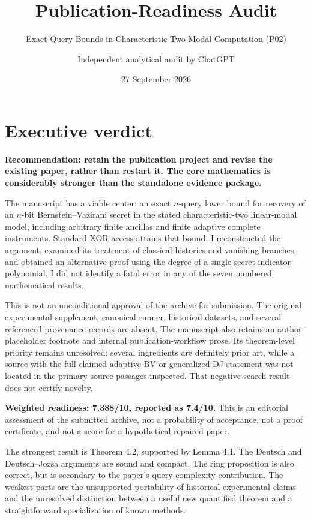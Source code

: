 \documentclass[
  11pt,
]{article}
\title{Publication-Readiness Audit}
\subtitle{Exact Query Bounds in Characteristic-Two Modal Computation
(P02)}
\author{Independent analytical audit by ChatGPT}
\date{27 September 2026}
\begin{document}
\maketitle

\section{Executive verdict}\label{executive-verdict}

\textbf{Recommendation: retain the publication project and revise the
existing paper, rather than restart it. The core mathematics is
considerably stronger than the standalone evidence package.}

The manuscript has a viable center: an exact \(n\)-query lower bound for
recovery of an \(n\)-bit Bernstein--Vazirani secret in the stated
characteristic-two linear-modal model, including arbitrary finite
ancillas and finite adaptive complete instruments. Standard XOR access
attains that bound. I reconstructed the argument, examined its treatment
of classical histories and vanishing branches, and obtained an
alternative proof using the degree of a single secret-indicator
polynomial. I did not identify a fatal error in any of the seven
numbered mathematical results.

This is not an unconditional approval of the archive for submission. The
original experimental supplement, canonical runner, historical datasets,
and several referenced provenance records are absent. The manuscript
also retains an author-placeholder footnote and internal
publication-workflow prose. Its theorem-level priority remains
unresolved: several ingredients are definitely prior art, while a source
with the full claimed adaptive BV or generalized DJ statement was not
located in the primary-source passages inspected. That negative search
result does not certify novelty.

\textbf{Weighted readiness: 7.388/10, reported as 7.4/10.} This is an
editorial assessment of the submitted archive, not a probability of
acceptance, not a proof certificate, and not a score for a hypothetical
repaired paper.

The strongest result is Theorem 4.2, supported by Lemma 4.1. The Deutsch
and Deutsch--Jozsa arguments are sound and compact. The ring proposition
is also correct, but is secondary to the paper's query-complexity
contribution. The weakest parts are the unsupported portability of
historical experimental claims and the unresolved distinction between a
useful new quantified theorem and a straightforward specialization of
known methods.
\end{document}
